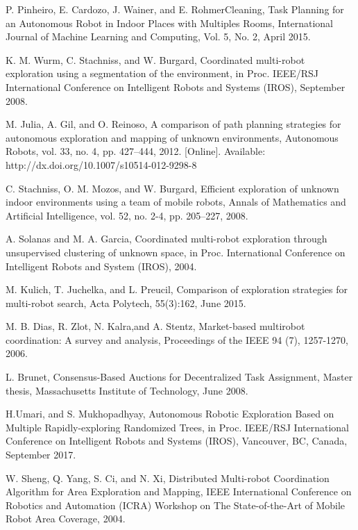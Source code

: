 \documentclass[letterpaper, 10 pt, conference]{ieeeconf}  %
\begin{document}
\begin{thebibliography}{99}
 P. Pinheiro, E. Cardozo, J. Wainer, and E. RohmerCleaning, Task Planning for an Autonomous Robot in Indoor Places with Multiples Rooms, International Journal of Machine Learning and Computing, Vol. 5, No. 2, April 2015.

 K. M. Wurm, C. Stachniss, and W. Burgard, Coordinated multi-robot exploration using a segmentation of the environment, in Proc. IEEE/RSJ  International Conference on Intelligent Robots and Systems (IROS), September 2008.

 M. Julia, A. Gil, and O. Reinoso, A comparison of path planning strategies for autonomous exploration and mapping of unknown environments, Autonomous Robots, vol. 33, no. 4, pp. 427–444, 2012. [Online]. Available: http://dx.doi.org/10.1007/s10514-012-9298-8

 C. Stachniss, O. M. Mozos, and W. Burgard, Efficient exploration of
unknown indoor environments using a team of mobile robots, Annals of Mathematics and Artificial Intelligence, vol. 52, no. 2-4, pp. 205–227, 2008.

 A. Solanas and M. A. Garcia, Coordinated multi-robot exploration through unsupervised clustering of unknown space, in Proc.  International Conference on Intelligent Robots and System (IROS), 2004.

 M. Kulich, T. Juchelka, and L. Preucil, Comparison of exploration strategies for multi-robot search, Acta Polytech, 55(3):162, June 2015. 

 M. B. Dias, R. Zlot, N. Kalra,and A. Stentz, Market-based multirobot coordination: A survey and analysis, Proceedings of the IEEE 94 (7), 1257-1270, 2006.

 L. Brunet, Consensus-Based Auctions for Decentralized Task Assignment, Master thesis, Massachusetts Institute of Technology, June 2008.

 H.Umari, and S. Mukhopadhyay, Autonomous Robotic Exploration Based on Multiple Rapidly-exploring Randomized Trees,  in Proc. IEEE/RSJ International Conference on Intelligent Robots and Systems (IROS), Vancouver, BC, Canada, September 2017.
  
 W. Sheng, Q. Yang, S. Ci, and N. Xi, Distributed Multi-robot Coordination Algorithm for Area Exploration and Mapping, IEEE International Conference on Robotics and Automation (ICRA) Workshop on The State-of-the-Art of Mobile Robot Area Coverage, 2004.


\end{thebibliography}
\end{document}
